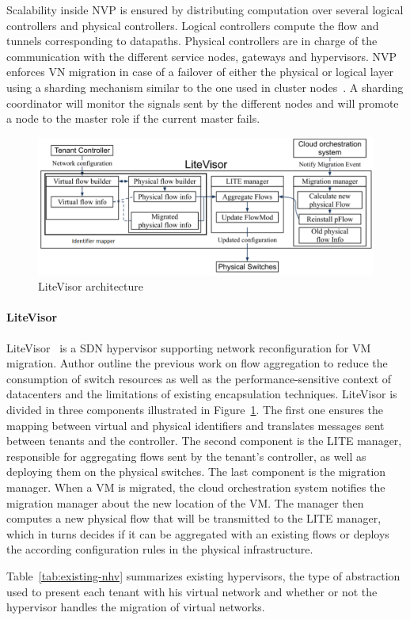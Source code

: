 Scalability inside NVP is ensured by distributing computation over several logical controllers and physical controllers. Logical controllers compute the flow and tunnels corresponding to datapaths. Physical controllers are in charge of the communication with the different service nodes, gateways and hypervisors.
NVP enforces VN migration in case of a failover of either the physical or logical layer using a sharding mechanism similar to the one used in cluster nodes~\cite{sharding}. 
A sharding coordinator will monitor the signals sent by the different nodes and will promote a node to the master role if the current master fails.


\begin{figure}
    \centering
    \includegraphics[scale=0.5]{figures/litevisor.pdf}
    \caption{LiteVisor architecture~\cite{Litevisor-Yang2018}}
    \label{fig:litevisor}
\end{figure}

\paragraph{LiteVisor}
LiteVisor~\cite{Litevisor-Yang2018} is a SDN hypervisor supporting network reconfiguration for VM migration.
Author outline the previous work on flow aggregation to reduce the consumption of switch resources as well as the performance-sensitive context of datacenters and the limitations of existing encapsulation techniques.
LiteVisor is divided in three components illustrated in Figure~\ref{fig:litevisor}. The first one ensures the mapping between virtual and physical identifiers and translates messages sent between tenants and the controller.
The second component is the LITE manager, responsible for aggregating flows sent by the tenant's controller, as well as deploying them on the physical switches. 
The last component is the migration manager. When a VM is migrated, the cloud orchestration system notifies the migration manager about the new location of the VM. The manager then computes a new physical flow that will be transmitted to the LITE manager, which in turns decides if it can be aggregated with an existing flows or deploys the according configuration rules in the physical infrastructure.

Table~\ref{tab:existing-nhv} summarizes existing hypervisors, the type of abstraction used to present each tenant with his virtual network and whether or not the hypervisor handles the migration of virtual networks.